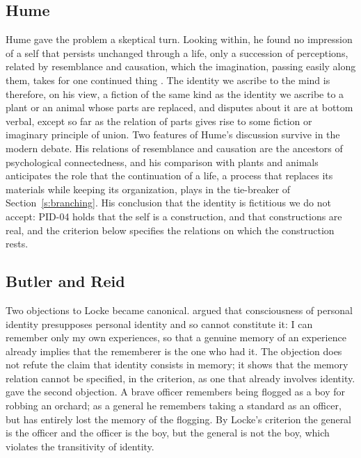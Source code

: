\documentclass{situationist-preprint}
\begin{document}
\subsection{Hume}

Hume gave the problem a skeptical turn. Looking within, he found no impression of a self that persists unchanged through a life, only a succession of perceptions, related by resemblance and causation, which the imagination, passing easily along them, takes for one continued thing \citep[I.iv.6]{Hume1739}. The identity we ascribe to the mind is therefore, on his view, a fiction of the same kind as the identity we ascribe to a plant or an animal whose parts are replaced, and disputes about it are at bottom verbal, except so far as the relation of parts gives rise to some fiction or imaginary principle of union. Two features of Hume's discussion survive in the modern debate. His relations of resemblance and causation are the ancestors of psychological connectedness, and his comparison with plants and animals anticipates the role that the continuation of a life, a process that replaces its materials while keeping its organization, plays in the tie-breaker of Section~\ref{s:branching}. His conclusion that the identity is fictitious we do not accept: PID-04 holds that the self is a construction, and that constructions are real, and the criterion below specifies the relations on which the construction rests.

\subsection{Butler and Reid}

Two objections to Locke became canonical. \citet{Butler1736} argued that consciousness of personal identity presupposes personal identity and so cannot constitute it: I can remember only my own experiences, so that a genuine memory of an experience already implies that the rememberer is the one who had it. The objection does not refute the claim that identity consists in memory; it shows that the memory relation cannot be specified, in the criterion, as one that already involves identity. \citet[III.6]{Reid1785} gave the second objection. A brave officer remembers being flogged as a boy for robbing an orchard; as a general he remembers taking a standard as an officer, but has entirely lost the memory of the flogging. By Locke's criterion the general is the officer and the officer is the boy, but the general is not the boy, which violates the transitivity of identity.
\end{document}
